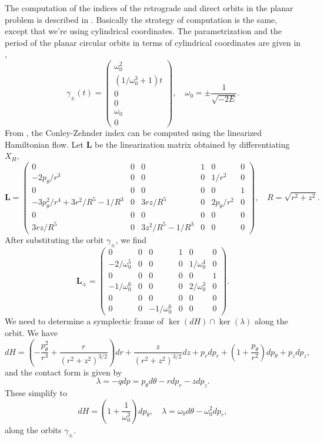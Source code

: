 \documentclass{amsart}
\renewcommand{\o}{\omega}
\newcommand{\g}{\gamma}
\begin{document}
The computation of the indices of the retrograde and direct orbits in the planar problem is described in \cite{Albers_Fish_Frauenfelder_vanKoert_13}.
Basically the strategy of computation is the same, except that we're using cylindrical coordinates.
The parametrization and the period of the planar circular orbits in terms of cylindrical coordinates are given in ,
	$$
	\g_\pm(t) = \begin{pmatrix}
		\o_0^2\\
		(1/\o_0^3 +1)t\\
		0\\
		0\\
		\o_0\\
		0
	\end{pmatrix},\quad
	\o_0 = \pm \frac{1}{\sqrt{-2E}}.
	$$
From , the Conley-Zehnder index can be computed using the linearized Hamiltonian flow.
Let $\mathbf{L}$ be the linearization matrix obtained by differentiating $X_H$,
$$
\mathbf{L}
=
\begin{pmatrix}
	0&0&0&1&0&0\\
	-2p_\theta/r^3&0&0&0&1/r^2&0\\
	0&0&0&0&0&1\\
	-3p_\theta^2/r^4 + 3r^2/R^5-1/R^3&0&3rz/R^5&0&2p_\theta/r^2&0\\
	0&0&0&0&0&0\\
	3rz/R^5&0&3z^2/R^5-1/R^3&0&0&0
\end{pmatrix},
\quad
R = \sqrt{r^2+z^2}.$$
After substituting the orbit $\g_\pm$, we find
$$
\mathbf{L}_\pm =\begin{pmatrix}
	0   &0  &0  &1  &0  &0\\
	- 2/\o_0^5   &0   &0 &0  &1/\o_0^4   &0\\
	0   &0  &0  &0  &0  &1\\
	-1/\o_0^6   &0  &0  &0  & 2/\o_0^3&  0\\
	0   &0  &0  &0  &0  &0\\
	0   &0  &-1/\o_0^6  &0  &0  &0
\end{pmatrix}.
$$
We need to determine a symplectic frame of $\ker(dH)\cap \ker(\lambda)$ along the orbit.
We have
$$
	dH =\left(-\frac{p_\theta^2}{r^3} + \frac{r}{(r^2+z^2)^{3/2}}\right)dr +\frac{z}{(r^2+z^2)^{3/2}}dz +p_r dp_r + \left(1+\frac{p_\theta}{r^2}\right)dp_\theta + p_z dp_z,
$$
and the contact form is given by
$$\lambda = -qdp = p_\theta d\theta-rdp_r - zdp_z.$$
These simplify to
$$
dH =\left(1+ \frac{1}{\o_0^3}\right)dp_\theta,\quad \lambda = \o_0 d\theta - \o_0^2 dp_r,
$$
along the orbits $\g_\pm$.
\end{document}
